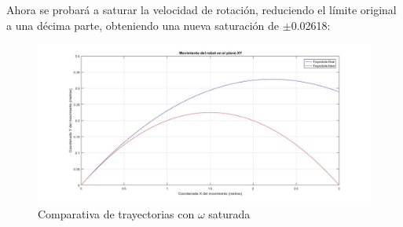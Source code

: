 \documentclass[a4paper,twoside]{article}
\begin{document}
Ahora se probará a saturar la velocidad de rotación, reduciendo el límite original a una décima parte, obteniendo una nueva saturación de $\pm$0.02618:
\begin{figure}[h!]
	\centering
	\includegraphics[width=1\textwidth]{parab_6}
	\caption{Comparativa de trayectorias con $\omega$ saturada}
\end{figure}
\end{document}
